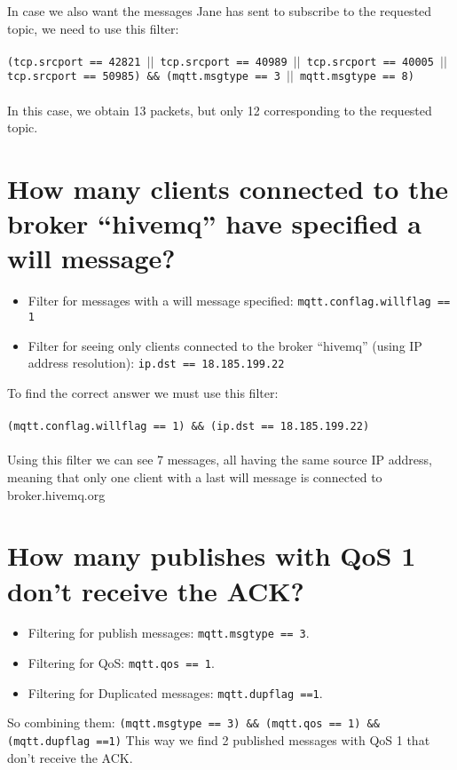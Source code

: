 \documentclass{article} %
\begin{document}
    In case we also want the messages Jane has sent to subscribe to the requested topic, we need to use this filter: \\ \\ 
    \texttt{(tcp.srcport == 42821 $||$ tcp.srcport == 40989 $||$ tcp.srcport == 40005 $||$ tcp.srcport == 50985) \&\&  (mqtt.msgtype == 3 $||$ mqtt.msgtype == 8)} \\ \\
    In this case, we obtain 13 packets, but only 12 corresponding to the requested topic.
 

\section{\large{How many clients connected to the broker “hivemq” have specified a will message?}}
    \begin{itemize}
        \item Filter for messages with a will message specified: \texttt{mqtt.conflag.willflag == 1}
        \item Filter for seeing only clients connected to the broker “hivemq” (using IP address resolution): \texttt{ip.dst == 18.185.199.22}
    \end{itemize}
    To find the correct answer we must use this filter: \\ \\
    \texttt{(mqtt.conflag.willflag == 1) \&\& (ip.dst == 18.185.199.22)} \\ \\
    Using this filter we can see 7 messages, all having the same source IP address, meaning that only one client with a last will message is connected to broker.hivemq.org


\section{\large{How many publishes with QoS 1 don’t receive the ACK?}}
    \begin{itemize}
        \item Filtering for publish messages: \texttt{mqtt.msgtype == 3}.
        \item Filtering for QoS: \texttt{mqtt.qos == 1}.
        \item Filtering for Duplicated messages: \texttt{mqtt.dupflag ==1}.
    \end{itemize}
    So combining them: \texttt{(mqtt.msgtype == 3) \&\& (mqtt.qos == 1) \&\& (mqtt.dupflag ==1)}
    This way we find 2 published messages with QoS 1 that don’t receive the ACK.
\end{document}
